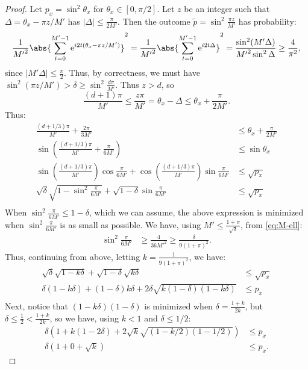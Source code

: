 \documentclass[11pt]{article}
\numberwithin{equation}{section}
\theoremstyle{definition}
\theoremstyle{plain}
\newcommand{\eee}{\mathrm e}
\begin{document}
\begin{proof}
Let $p_x=\sin^2\theta_x$ for $\theta_x\in [0,\pi/2]$. Let $z$ be an integer such that $\Delta=\theta_x-\pi z/M'$ has $|\Delta|\leq \frac{\pi}{2M'}$. Then the outcome $\tilde p = \sin^2\frac{\pi z}{M'}$ has probability:
$$\frac{1}{{M'}^2}\abs{\sum_{t=0}^{M'-1}\eee^{i2t(\theta_x-\pi z/M')}}^2=\frac{1}{{M'}^2}\abs{\sum_{t=0}^{M'-1}\eee^{i2 t\Delta}}^2=\frac{\sin^2(M'\Delta)}{{M'}^2\sin^2\Delta}\geq \frac{4}{\pi^2},$$
since $|M'\Delta|\leq \frac{\pi}{2}$. Thus, by correctness, we must have $\sin^2(\pi z/M')> \delta\geq \sin^2\frac{d\pi}{M'}$. Thus $z>d$, so 
$$\frac{(d+1)\pi}{M'}\leq \frac{z\pi}{M'}=\theta_x-\Delta\leq \theta_x+\frac{\pi}{2M'}.$$
Thus:
\begin{align*}
\frac{(d+1/3)\pi}{M'}+\frac{2\pi}{3M'} & \leq \theta_x+\frac{\pi}{2M'}\\
\sin\left(\frac{(d+1/3)\pi}{M'}+\frac{\pi}{6M'}\right) &\leq \sin\theta_x\\
\sin\left(\frac{(d+1/3)\pi}{M'}\right)\cos\frac{\pi}{6M'}+\cos\left(\frac{(d+1/3)\pi}{M'}\right)\sin\frac{\pi}{6M'} &\leq \sqrt{p_x}\\
\sqrt{\delta}\sqrt{1-\sin^2\frac{\pi}{6M'}}+\sqrt{1-\delta}\sin\frac{\pi}{6M'} &\leq \sqrt{p_x}\\
\end{align*}
When $\sin^2\frac{\pi}{6M'}\leq 1-\delta$, which we can assume, the above expression is minimized when $\sin^2\frac{\pi}{6M'}$ is as small as possible.
We have, using $M'\leq \frac{1+\pi}{\sqrt{\delta}}$, from \eqref{eq:M-ell}:
\begin{align*}
\sin^2\frac{\pi}{6M'} &\geq \frac{4}{36{M'}^2}\geq \frac{\delta}{9(1+\pi)^2}.
\end{align*}
Thus, continuing from above, letting $k=\frac{1}{9(1+\pi)^2}$, we have:
\begin{align*}
\sqrt{\delta}\sqrt{1-k\delta}+\sqrt{1-\delta}\sqrt{k\delta} &\leq \sqrt{p_x}\\
\delta(1-k\delta)+(1-\delta)k\delta+2\delta\sqrt{k (1-\delta)(1-k\delta)} &\leq p_x\\
\end{align*}
Next, notice that $(1-k\delta)(1-\delta)$ is minimized when $\delta=\frac{1+k}{2k}$, but $\delta\leq \frac{1}{2} < \frac{1+k}{2k}$, so we have, using $k<1$ and $\delta\leq 1/2$:
\begin{align*}
\delta(1+k(1-2\delta)+2\sqrt{k}\sqrt{(1-k/2)(1-1/2)}) &\leq p_x\\
\delta(1+0+\sqrt{k}) &\leq p_x.
\end{align*}





\end{proof}
\end{document}
